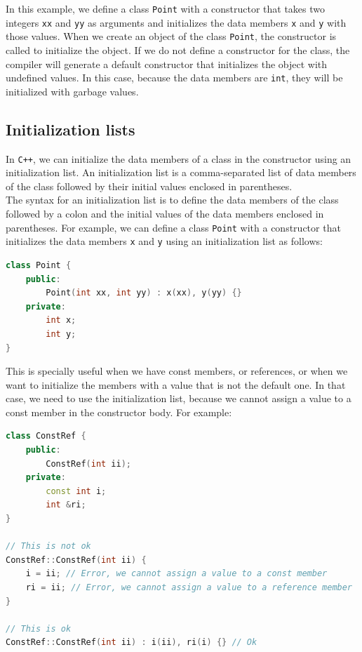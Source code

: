 In this example, we define a class \texttt{Point} with a constructor that takes two integers
\texttt{xx} and \texttt{yy} as arguments and initializes the data members \texttt{x} and \texttt{y}
with those values. When we create an object of the class \texttt{Point}, the constructor is called
to initialize the object. If we do not define a constructor for the class, the compiler will generate
a default constructor that initializes the object with undefined values. In this case, because the
data members are \texttt{int}, they will be initialized with garbage values.

\subsection{Initialization lists}

In \texttt{C++}, we can initialize the data members of a class in the constructor using an
initialization list. An initialization list is a comma-separated list of data members of the
class followed by their initial values enclosed in parentheses.\\

The syntax for an initialization list is to define the data members of the class followed by
a colon and the initial values of the data members enclosed in parentheses. For example, we
can define a class \texttt{Point} with a constructor that initializes the data members \texttt{x}
and \texttt{y} using an initialization list as follows:\\

\begin{lstlisting}[language=C++]
class Point {
    public:
        Point(int xx, int yy) : x(xx), y(yy) {}
    private:
        int x;
        int y;
}
\end{lstlisting}

This is specially useful when we have const members, or references, or when we want to initialize
the members with a value that is not the default one. In that case, we need to use the initialization
list, because we cannot assign a value to a const member in the constructor body. For example:\\

\begin{lstlisting}[language=C++]
class ConstRef {
    public:
        ConstRef(int ii);
    private:
        const int i;
        int &ri;
}

// This is not ok
ConstRef::ConstRef(int ii) {
    i = ii; // Error, we cannot assign a value to a const member
    ri = ii; // Error, we cannot assign a value to a reference member
}

// This is ok
ConstRef::ConstRef(int ii) : i(ii), ri(i) {} // Ok
\end{lstlisting}

